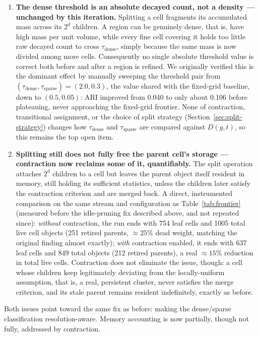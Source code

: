 \documentclass[11pt]{article}
\begin{document}
\begin{enumerate}
    \item \textbf{The dense threshold is an absolute decayed count, not a density — unchanged by this iteration.} Splitting a cell fragments its accumulated mass across its $2^d$ children. A region can be genuinely dense, that is, have high mass per unit volume, while every fine cell covering it holds too little raw decayed count to cross $\tau_{\text{dense}}$, simply because the same mass is now divided among more cells. Consequently no single absolute threshold value is correct both before and after a region is refined. We originally verified this is the dominant effect by manually sweeping the threshold pair from $(\tau_{\text{dense}}, \tau_{\text{sparse}}) = (2.0, 0.3)$, the value shared with the fixed-grid baseline, down to $(0.5, 0.05)$: ARI improved from 0.040 to only about 0.106 before plateauing, never approaching the fixed-grid frontier. None of contraction, transitional assignment, or the choice of split strategy (Section~\ref{sec:split-strategy}) changes how $\tau_{\text{dense}}$ and $\tau_{\text{sparse}}$ are compared against $D(g,t)$, so this remains the top open item.
    \item \textbf{Splitting still does not fully free the parent cell's storage — contraction now reclaims some of it, quantifiably.} The split operation attaches $2^d$ children to a cell but leaves the parent object itself resident in memory, still holding its sufficient statistics, unless the children later satisfy the contraction criterion and are merged back. A direct, instrumented comparison on the same stream and configuration as Table~\ref{tab:frontier} (measured before the idle-pruning fix described above, and not repeated since): \emph{without} contraction, the run ends with 754 leaf cells and 1005 total live cell objects (251 retired parents, $\approx 25\%$ dead weight, matching the original finding almost exactly); \emph{with} contraction enabled, it ends with 637 leaf cells and 849 total objects (212 retired parents), a real $\approx 15\%$ reduction in total live cells. Contraction does not eliminate the issue, though: a cell whose children keep legitimately deviating from the locally-uniform assumption, that is, a real, persistent cluster, never satisfies the merge criterion, and its stale parent remains resident indefinitely, exactly as before.
\end{enumerate}

Both issues point toward the same fix as before: making the dense/sparse classification resolution-aware. Memory accounting is now partially, though not fully, addressed by contraction.
\end{document}
